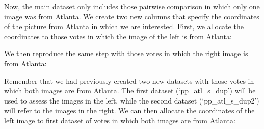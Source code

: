\documentclass[
]{article}
\newenvironment{Shaded}{\begin{snugshade}}{\end{snugshade}}
\newcommand{\NormalTok}[1]{#1}
\newcommand{\OperatorTok}[1]{\textcolor[rgb]{0.81,0.36,0.00}{\textbf{#1}}}
\newcommand{\StringTok}[1]{\textcolor[rgb]{0.31,0.60,0.02}{#1}}
\begin{document}
Now, the main dataset only includes those pairwise comparison in which
only one image was from Atlanta. We create two new columns that specify
the coordinates of the picture from Atlanta in which we are interested.
First, we allocate the coordinates to those votes in which the image of
the left is from Atlanta:

\begin{Shaded}
\end{Shaded}

We then reproduce the same step with those votes in which the right
image is from Atlanta:

\begin{Shaded}
\end{Shaded}

Remember that we had previously created two new datasets with those
votes in which both images are from Atlanta. The first dataset
(`pp\_atl\_s\_dup') will be used to assess the images in the left, while
the second dataset (`pp\_atl\_s\_dup2') will refer to the images in the
right. We can then allocate the coordinates of the left image to first
dataset of votes in which both images are from Atlanta:
\end{document}
